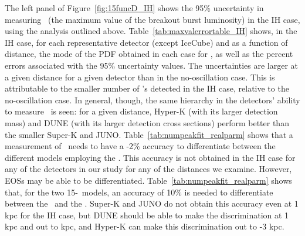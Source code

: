 The left panel of Figure~\ref{fig:15funcD_IH} shows the 95\% uncertainty
in measuring \lmax\ (the maximum value of the breakout burst
luminosity) in the IH case, using the analysis outlined above.
Table~\ref{tab:maxvalerrortable_IH}  shows, in the IH case, for each
representative detector (except IceCube) and as a function of
distance, the mode of the PDF obtained in each case for \lmax, as well
as the percent errors associated with the 95\% uncertainty values.
The uncertainties are larger
at a given distance for a given detector than in the no-oscillation 
case.    This is attributable to the
smaller number of \nue's detected in the IH case, 
relative to the no-oscillation case.  
In general, though, the same hierarchy in the detectors'
ability to measure \lmax\ is seen:  for a given distance, 
Hyper-K (with its larger detection mass) and DUNE (with its larger
detection cross sections)
perform better than the smaller Super-K and
JUNO.
Table~\ref{tab:numpeakfit_realparm} shows that a measurement of \lmax\
needs to have a -2\% accuracy to differentiate between the
different models employing the \ls.  This accuracy is not obtained in
the IH case for
any of the detectors in our study for any of the distances we
examine.  However, EOSs may be able to be
differentiated.  Table~\ref{tab:numpeakfit_realparm} shows that, for
the two 15-\Msol\ models, an accuracy of 10\% is needed to
differentiate between the \ls\ and the \shen.  
Super-K and JUNO do not
obtain this accuracy even at 1 kpc for the IH case, 
but DUNE should be able to make
the discrimination at 1 kpc and out to  kpc, and
Hyper-K can make this discrimination out to \abt 2-3 kpc.

